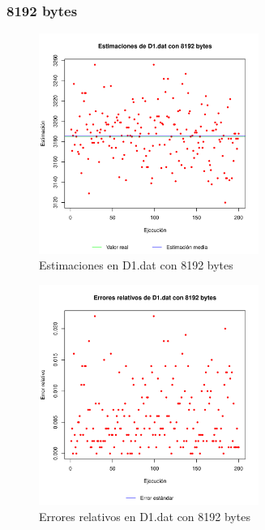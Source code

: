 \subsubsection{8192 bytes}
\begin{figure}[h!]
    \centering
        \includegraphics[width=0.64\textwidth]{../figs/D1/plot_estimation_8192.pdf}
        \caption{Estimaciones en D1.dat con 8192 bytes}
    \label{figura:D1_estimation_8192}
\end{figure}

\begin{figure}[h!]
    \centering
        \includegraphics[width=0.64\textwidth]{../figs/D1/plot_errors_8192.pdf}
        \caption{Errores relativos en D1.dat con 8192 bytes}
    \label{figura:D1_errors_8192}
\end{figure}

